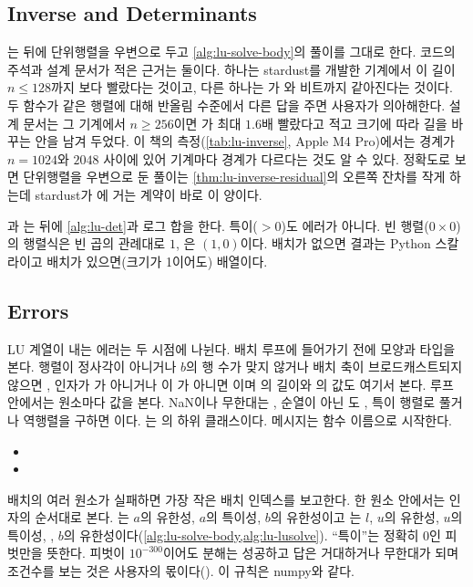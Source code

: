 \subsection{Inverse and Determinants}

는  뒤에 단위행렬을 우변으로 두고 \cref{alg:lu-solve-body}의 풀이를 그대로 한다. 코드의 주석과 설계 문서가 적은 근거는 둘이다. 하나는 stardust를 개발한 기계에서 이 길이 $n\le128$까지 보다 빨랐다는 것이고, 다른 하나는 가 와 비트까지 같아진다는 것이다. 두 함수가 같은 행렬에 대해 반올림 수준에서 다른 답을 주면 사용자가 의아해한다. 설계 문서는 그 기계에서 $n\ge256$이면 가 최대 $1.6$배 빨랐다고 적고 크기에 따라 길을 바꾸는 안을 남겨 두었다. 이 책의 측정(\cref{tab:lu-inverse}, Apple M4 Pro)에서는 경계가 $n=1024$와 $2048$ 사이에 있어 기계마다 경계가 다르다는 것도 알 수 있다. 정확도로 보면 단위행렬을 우변으로 둔 풀이는 \cref{thm:lu-inverse-residual}의 오른쪽 잔차를 작게 하는데 stardust가 에 거는 계약이 바로 이 양이다.

과 는  뒤에 \cref{alg:lu-det}과 로그 합을 한다. 특이($>0$)도 에러가 아니다. 빈 행렬($0\times0$)의 행렬식은 빈 곱의 관례대로 $1$, 은 $(1,0)$이다. 배치가 없으면 결과는 Python 스칼라이고 배치가 있으면(크기가 1이어도) 배열이다.

\subsection{Errors}

LU 계열이 내는 에러는 두 시점에 나뉜다. 배치 루프에 들어가기 전에 모양과 타입을 본다. 행렬이 정사각이 아니거나 $b$의 행 수가 맞지 않거나 배치 축이 브로드캐스트되지 않으면 , 인자가 가 아니거나 이 가 아니면 이며 의 길이와 의 값도 여기서 본다. 루프 안에서는 원소마다 값을 본다. NaN이나 무한대는 , 순열이 아닌 도 , 특이 행렬로 풀거나 역행렬을 구하면 이다. 는 의 하위 클래스이다. 메시지는 함수 이름으로 시작한다.
\begin{itemize}
\item {}
\item {}
\end{itemize}
배치의 여러 원소가 실패하면 가장 작은 배치 인덱스를 보고한다. 한 원소 안에서는 인자의 순서대로 본다. 는 $a$의 유한성, $a$의 특이성, $b$의 유한성이고 는 $l$, $u$의 유한성, $u$의 특이성, , $b$의 유한성이다(\cref{alg:lu-solve-body,alg:lu-lusolve}). ``특이''는 정확히 $0$인 피벗만을 뜻한다. 피벗이 $10^{-300}$이어도 분해는 성공하고 답은 거대하거나 무한대가 되며 조건수를 보는 것은 사용자의 몫이다(). 이 규칙은 numpy와 같다.


